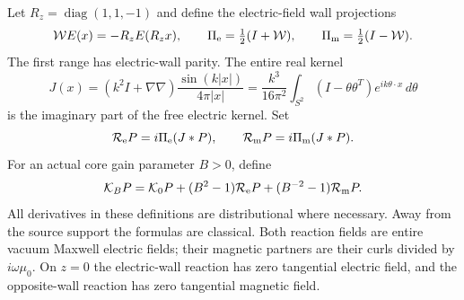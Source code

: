 Let $R_z=\operatorname{diag}(1,1,-1)$ and define the electric-field
wall projections
\begin{equation}\label{cl:projections}
 \mathcal W E(x)=-R_zE(R_zx),\qquad
 \Pi_{\rm e}=\tfrac12(I+\mathcal W),\qquad
 \Pi_{\rm m}=\tfrac12(I-\mathcal W).
\end{equation}
The first range has electric-wall parity. The entire real kernel
\begin{equation}\label{cl:J}
 J(x)=(k^2I+\nabla\nabla)\frac{\sin(k|x|)}{4\pi|x|}
 =\frac{k^3}{16\pi^2}\int_{S^2}
       (I-\theta\theta^T)e^{ik\theta\cdot x}\,d\theta
\end{equation}
is the imaginary part of the free electric kernel. Set
\[
 \mathcal R_{\rm e}P=i\Pi_{\rm e}(J*P),\qquad
 \mathcal R_{\rm m}P=i\Pi_{\rm m}(J*P).
\]
For an actual core gain parameter $B>0$, define
\begin{equation}\label{cl:kernel}
 \mathcal K_BP=\mathcal K_0P
       +(B^2-1)\mathcal R_{\rm e}P
       +(B^{-2}-1)\mathcal R_{\rm m}P.
\end{equation}
All derivatives in these definitions are distributional where
necessary. Away from the source support the formulas are classical.
Both reaction fields are entire vacuum Maxwell electric fields;
their magnetic partners are their curls divided by $i\omega\mu_0$.
On $z=0$ the electric-wall reaction has zero tangential electric
field, and the opposite-wall reaction has zero tangential magnetic
field.

